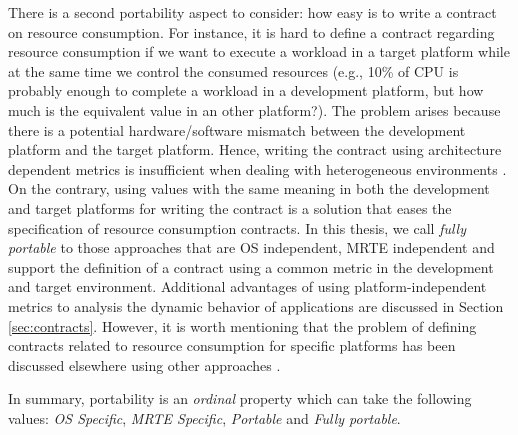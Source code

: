 \begin{itemize}
There is a second portability aspect to consider: how easy is to write a contract on resource consumption.
For instance, it is hard to define a contract regarding resource consumption if we want to execute a workload in a target platform while at the same time we control the consumed resources (e.g., 10\% of CPU is probably enough to complete a workload in a development platform, but how much is the equivalent value in an other platform?).
The problem arises because there is a potential hardware/software mismatch between the development platform and the target platform.
Hence, writing the contract using architecture dependent metrics is insufficient when dealing with heterogeneous environments \cite{Daly2001, Dufour:2003:DMJ:949343.949320}.
On the contrary, using values with the same meaning in both the development and target platforms for writing the contract is a solution that eases the specification of resource consumption contracts.
In this thesis, we call \textit{fully portable} to those approaches that are OS independent, MRTE independent and support the definition of a contract using a common metric in the development and target environment.
Additional advantages of using platform-independent metrics to analysis the dynamic behavior of applications are discussed in Section \ref{sec:contracts}.
However, it is worth mentioning that the problem of defining contracts related to resource consumption for specific platforms has been discussed elsewhere using other approaches \cite{Lambert200897, Pathak:2012:ESI:2168836.2168841}.


In summary, portability is an \textit{ordinal} property which can take the following values: \textit{OS Specific}, \textit{MRTE Specific}, \textit{Portable} and  \textit{Fully portable}.


\end{itemize}
